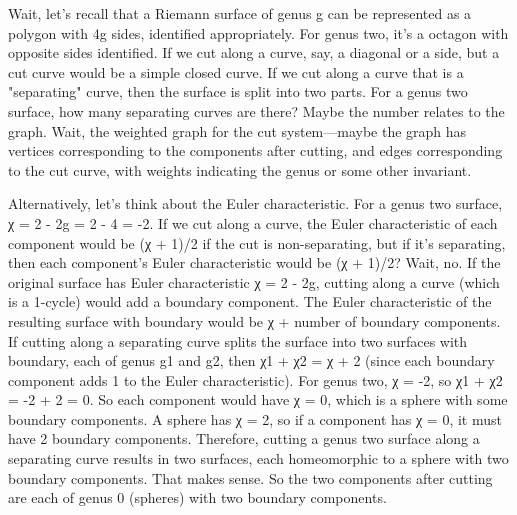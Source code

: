 Wait, let's recall that a Riemann surface of genus g can be represented as a polygon with 4g sides, identified appropriately. For genus two, it's a octagon with opposite sides identified. If we cut along a curve, say, a diagonal or a side, but a cut curve would be a simple closed curve. If we cut along a curve that is a "separating" curve, then the surface is split into two parts. For a genus two surface, how many separating curves are there? Maybe the number relates to the graph. Wait, the weighted graph for the cut system—maybe the graph has vertices corresponding to the components after cutting, and edges corresponding to the cut curve, with weights indicating the genus or some other invariant. 

Alternatively, let's think about the Euler characteristic. For a genus two surface, χ = 2 - 2g = 2 - 4 = -2. If we cut along a curve, the Euler characteristic of each component would be (χ + 1)/2 if the cut is non-separating, but if it's separating, then each component's Euler characteristic would be (χ + 1)/2? Wait, no. If the original surface has Euler characteristic χ = 2 - 2g, cutting along a curve (which is a 1-cycle) would add a boundary component. The Euler characteristic of the resulting surface with boundary would be χ + number of boundary components. If cutting along a separating curve splits the surface into two surfaces with boundary, each of genus g1 and g2, then χ1 + χ2 = χ + 2 (since each boundary component adds 1 to the Euler characteristic). For genus two, χ = -2, so χ1 + χ2 = -2 + 2 = 0. So each component would have χ = 0, which is a sphere with some boundary components. A sphere has χ = 2, so if a component has χ = 0, it must have 2 boundary components. Therefore, cutting a genus two surface along a separating curve results in two surfaces, each homeomorphic to a sphere with two boundary components. That makes sense. So the two components after cutting are each of genus 0 (spheres) with two boundary components. 


